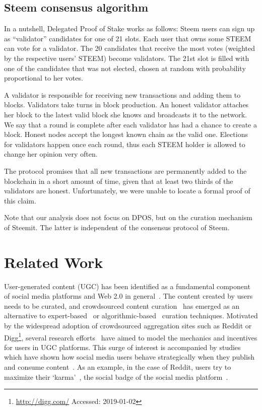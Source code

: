 \documentclass[a4paper,english,cleveref, autoref]{oasics-v2019}
\begin{document}
  \subsection{Steem consensus algorithm}
    In a nutshell,   Delegated Proof of Stake
    \cite{steemdpos,bitsharesdpos,steem} works as follows: Steem users can sign
    up as ``validator'' candidates for one of 21 slots. Each user that owns some
    STEEM can vote for a validator. The 20 candidates that receive the most votes
    (weighted by the respective users' STEEM) become validators. The 21st slot
    is filled with one of the candidates that was not elected, chosen at random
    with probability proportional to her votes.

    A validator is responsible for receiving new transactions and adding them to
    blocks. Validators take turns in block production. An honest validator
    attaches her block to the latest valid block she knows and broadcasts it to
    the network. We say that a round is complete after each validator has had a
    chance to create a block. Honest nodes accept the longest known chain as the
    valid one. Elections for validators happen once each round, thus each STEEM
    holder is allowed to change her opinion very often.

    The protocol promises that all new transactions are permanently added to the
    blockchain in a short amount of time, given that at least two thirds of the
    validators are honest. Unfortunately, we were unable to locate a formal
    proof of this claim.

    Note that our analysis does not focus on DPOS, but on the curation mechanism
    of Steemit. The latter is independent of the consensus protocol of Steem.

\section{Related Work}
  User-generated content (UGC) has been identified as a fundamental component of
  social media platforms and Web 2.0 in general~\cite{kaplan2010users}. The
  content created by users needs to be curated, and crowdsourced content
  curation~\cite{askalidis2013theoretical} has emerged as an alternative to
  expert-based~\cite{stanoevska2012content} or
  algorithmic-based~\cite{rader2015understanding} curation techniques. Motivated
  by the widespread adoption of crowdsourced aggregation sites such as Reddit or
  Digg\footnote{\url{http://digg.com/} Accessed: 2019-01-02}, several research
  efforts~\cite{das2010ranking,ghosh2011incentivizing,abbassi2014distributed}
  have aimed to model the mechanics and incentives for users in UGC platforms.
  This surge of interest is accompanied by studies which have shown how social
  media users behave strategically when they publish and consume
  content~\cite{may2014filter}. As an example, in the case of Reddit, users try
  to maximize their `karma'~\cite{bergstrom2011don}, the social badge of the
  social media platform~\cite{anderson2013steering}.
\end{document}
